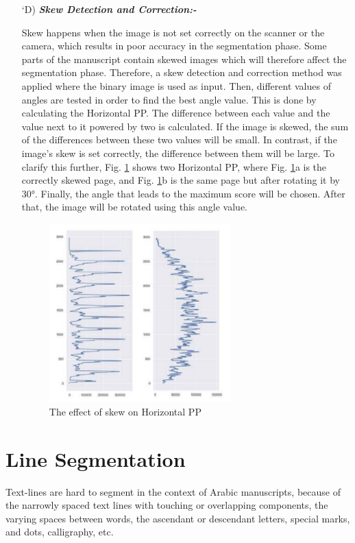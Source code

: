 \begin{itemize}[labelindent=1em,labelsep=0.25cm,leftmargin=*]
        \item[\char `D)] \textit{\textbf{Skew Detection and Correction:-}}
        
        Skew happens when the image is not set correctly on the
        scanner or the camera, which results in poor accuracy in the
        segmentation phase.
        Some parts of the manuscript contain skewed images which
        will therefore affect the segmentation phase. Therefore, a skew
        detection and correction method was applied where the binary
        image is used as input. Then, different values of angles are
        tested in order to find the best angle value. This is done by
        calculating the Horizontal PP. The difference between each
        value and the value next to it powered by two is calculated. If
        the image is skewed, the sum of the differences between these
        two values will be small. In contrast, if the image’s skew is
        set correctly, the difference between them will be large. To
        clarify this further, Fig. \ref{fig:skew} shows two Horizontal PP, where
        Fig. \ref{fig:skew}a is the correctly skewed page, and Fig. \ref{fig:skew}b is the same
        page but after rotating it by 30°. Finally, the angle that leads
        to the maximum score will be chosen. After that, the image
        will be rotated using this angle value.
        \begin{figure}[!htb]
            \centering
            \includegraphics[width=7cm]{images/skew.png}
            \caption{The effect of skew on Horizontal PP}
            \label{fig:skew}
        \end{figure}
    \end{itemize}

\section{Line Segmentation}
Text-lines are hard to segment in the context of Arabic manuscripts, because of the narrowly spaced text lines with touching or overlapping components, the varying spaces between words, the ascendant or descendant letters, special marks, and dots, calligraphy, etc.\\

